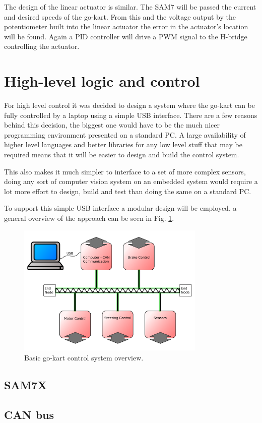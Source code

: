 The design of the linear actuator is similar. The SAM7 will be passed the
current and desired speeds of the go-kart. From this and the voltage output by
the potentiometer built into the linear actuator the error in the actuator's
location will be found. Again a PID controller will drive a PWM signal to the
H-bridge controlling the actuator.

\section{High-level logic and control}

For high level control it was decided to design a system where the go-kart can
be fully controlled by a laptop using a simple USB interface.  There are a few
reasons behind this decision, the biggest one would have to be the much nicer
programming environment presented on a standard PC.  A large availability of
higher level languages and better libraries for any low level stuff that may be
required means that it will be easier to design and build the control system.

This also makes it much simpler to interface to a set of more complex sensors,
doing any sort of computer vision system on an embedded system would require a
lot more effort to design, build and test than doing the same on a standard PC.

To support this simple USB interface a modular design will be employed, a
general overview of the approach can be seen in Fig. \ref{can-design}.

\begin{figure}
  \centering
  \includegraphics[width=0.8\textwidth]{../../Images/can_diagram.pdf}
  \caption{Basic go-kart control system overview.\label{can-design}}
\end{figure}

\subsection{SAM7X}

\subsection{CAN bus}

